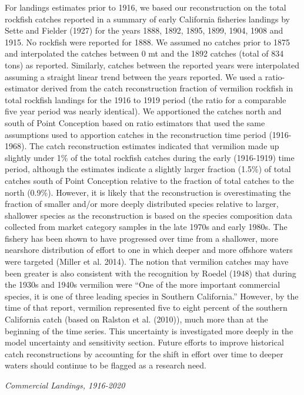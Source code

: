 \documentclass[
  english,
  a4paper,
]{article}
\begin{document}
For landings estimates prior to 1916, we based our reconstruction on the total
rockfish catches reported in a summary of early California fisheries landings by
Sette and Fielder (1927) for the years 1888, 1892, 1895, 1899, 1904, 1908
and 1915. No rockfish were reported for 1888. We assumed no catches prior to 1875
and interpolated the catches between 0 mt and the 1892 catches (total of 834
tons) as reported. Similarly, catches between the reported years were interpolated
assuming a straight linear trend between the years reported. We used a
ratio-estimator derived from the catch reconstruction fraction of vermilion
rockfish in total rockfish landings for the 1916 to 1919 period (the ratio for
a comparable five year period was nearly identical). We apportioned the catches
north and south of Point Conception based on ratio estimators that used the same
assumptions used to apportion catches in the reconstruction time period (1916-1968).
The catch reconstruction estimates indicated that vermilion made up slightly under
1\% of the total rockfish catches during the early (1916-1919) time period, although
the estimates indicate a slightly larger fraction (1.5\%) of total catches south of
Point Conception relative to the fraction of total catches to the north (0.9\%). However,
it is likely that the reconstruction is overestimating the fraction of smaller and/or
more deeply distributed species relative to larger, shallower species as the
reconstruction is based on the species composition data collected from market
category samples in the late 1970s and early 1980s. The fishery has been shown
to have progressed over time from a shallower, more nearshore distribution of
effort to one in which deeper and more offshore waters were targeted (Miller et al. 2014).
The notion that vermilion catches may have been greater is also consistent with
the recognition by Roedel (1948) that during the 1930s and 1940s vermilion
were ``One of the more important commercial species, it is one of three leading
species in Southern California.'' However, by the time of that report, vermilion
represented five to eight percent of the southern California catch (based on
Ralston et al. (2010)), much more than at the beginning of the time
series. This uncertainty is investigated more deeply in the model uncertainty and sensitivity section. Future efforts to improve historical catch reconstructions by accounting
for the shift in effort over time to deeper waters should continue to be flagged
as a research need.

\emph{Commercial Landings, 1916-2020}
\end{document}
